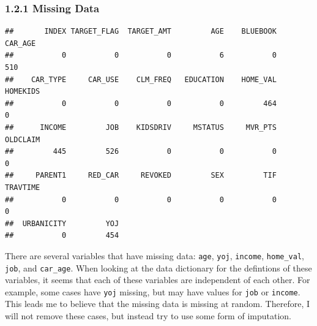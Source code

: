 \documentclass[]{article}
\begin{document}
\hypertarget{missing-data}{\subsubsection{1.2.1 Missing
Data}\label{missing-data}}

\begin{verbatim}
##       INDEX TARGET_FLAG  TARGET_AMT         AGE    BLUEBOOK     CAR_AGE 
##           0           0           0           6           0         510 
##    CAR_TYPE     CAR_USE    CLM_FREQ   EDUCATION    HOME_VAL    HOMEKIDS 
##           0           0           0           0         464           0 
##      INCOME         JOB    KIDSDRIV     MSTATUS     MVR_PTS    OLDCLAIM 
##         445         526           0           0           0           0 
##     PARENT1     RED_CAR     REVOKED         SEX         TIF    TRAVTIME 
##           0           0           0           0           0           0 
##  URBANICITY         YOJ 
##           0         454
\end{verbatim}

There are several variables that have missing data: \texttt{age},
\texttt{yoj}, \texttt{income}, \texttt{home\_val}, \texttt{job}, and
\texttt{car\_age}. When looking at the data dictionary for the
defintions of these variables, it seems that each of these variables are
independent of each other. For example, some cases have \texttt{yoj}
missing, but may have values for \texttt{job} or \texttt{income}. This
leads me to believe that the missing data is missing at random.
Therefore, I will not remove these cases, but instead try to use some
form of imputation.
\end{document}
